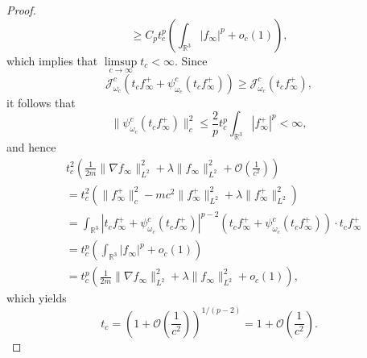 \documentclass{amsart}
\theoremstyle{plain}
\theoremstyle{definition}
\theoremstyle{remark}
\numberwithin{equation}{section} \numberwithin{figure}{section}
\begin{document}
\begin{proof}
\begin{equation}
      \geq C_p t_c^p \left( \int_{\mathbb{R}^3} |f_\infty|^p + o_c(1) \right),
  \end{equation}
  which implies that \( \limsup\limits_{c \to \infty} t_c < \infty \). Since
  \[
      \mathcal{J}^c_{\omega_c} \left( t_c f_\infty^+ + \psi_{\omega_c}^c(t_c f_\infty^+) \right) \geq \mathcal{J}^c_{\omega_c} (t_c f_\infty^+),
  \]
  it follows that
  \[
      \| \psi_{\omega_c}^c(t_c f_\infty^+) \|_c^2 \leq \frac{2}{p} t_c^p \int_{\mathbb{R}^3} |f_\infty^+|^p < \infty,
  \]
  and hence
  \begin{equation}\label{as_1}
        \begin{split}
          &t_c^2 \left( \frac{1}{2m} \| \nabla f_\infty \|_{L^2}^2 + \lambda \| f_\infty \|_{L^2}^2 + \mathcal{O}\left(\frac{1}{c^2}\right) \right) \\
          &= t_c^2 \left( \| f_\infty^+ \|_c^2 - mc^2 \| f_\infty^+ \|_{L^2}^2 + \lambda \| f_\infty^+ \|_{L^2}^2 \right) \\
          &= \int_{\mathbb{R}^3} \left| t_c f_\infty^+ + \psi_{\omega_c}^c(t_c f_\infty^+) \right|^{p-2}
              \left( t_c f_\infty^+ + \psi_{\omega_c}^c(t_c f_\infty^+) \right) \cdot t_c f_\infty^+ \\
          &= t_c^p \left( \int_{\mathbb{R}^3} |f_\infty|^p + o_c(1) \right) \\
          &= t_c^p \left( \frac{1}{2m} \| \nabla f_\infty \|_{L^2}^2 + \lambda \| f_\infty \|_{L^2}^2 + o_c(1) \right),
      \end{split}
  \end{equation}
  which yields 
  $$
  t_c= \left(1+\mathcal{O}\left(\frac{1}{c^2}\right) \right)^{1/(p-2)}= 1+ \mathcal{O}\left(\frac{1}{c^2}\right).
  $$
\end{proof}
\end{document}
